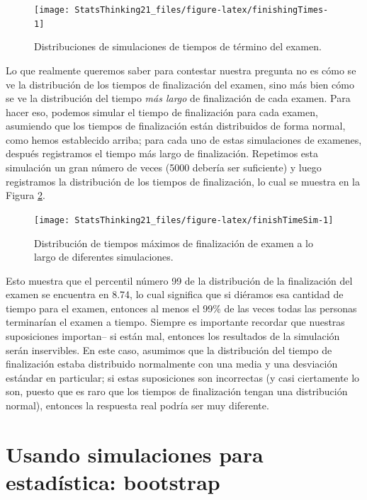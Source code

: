 \documentclass[
  12pt,
]{book}
\begin{document}
\begin{figure}
\texttt{[image: StatsThinking21\_files/figure-latex/finishingTimes-1]} \caption{Distribuciones de simulaciones de tiempos de término del examen.}\label{fig:finishingTimes}
\end{figure}

Lo que realmente queremos saber para contestar nuestra pregunta no es cómo se ve la distribución de los tiempos de finalización del examen, sino más bien cómo se ve la distribución del tiempo \emph{más largo} de finalización de cada examen. Para hacer eso, podemos simular el tiempo de finalización para cada examen, asumiendo que los tiempos de finalización están distribuidos de forma normal, como hemos establecido arriba; para cada uno de estas simulaciones de examenes, después registramos el tiempo más largo de finalización. Repetimos esta simulación un gran número de veces (5000 debería ser suficiente) y luego registramos la distribución de los tiempos de finalización, lo cual se muestra en la Figura \ref{fig:finishTimeSim}.

\begin{figure}
\texttt{[image: StatsThinking21\_files/figure-latex/finishTimeSim-1]} \caption{Distribución de tiempos máximos de finalización de examen a lo largo de diferentes simulaciones.}\label{fig:finishTimeSim}
\end{figure}

Esto muestra que el percentil número 99 de la distribución de la finalización del examen se encuentra en 8.74, lo cual significa que si diéramos esa cantidad de tiempo para el examen, entonces al menos el 99\% de las veces todas las personas terminarían el examen a tiempo. Siempre es importante recordar que nuestras suposiciones importan-- si están mal, entonces los resultados de la simulación serán inservibles. En este caso, asumimos que la distribución del tiempo de finalización estaba distribuido normalmente con una media y una desviación estándar en particular; si estas suposiciones son incorrectas (y casi ciertamente lo son, puesto que es raro que los tiempos de finalización tengan una distribución normal), entonces la respuesta real podría ser muy diferente.

\hypertarget{usando-simulaciones-para-estaduxedstica-bootstrap}{%
\section{Usando simulaciones para estadística: bootstrap}\label{usando-simulaciones-para-estaduxedstica-bootstrap}}
\end{document}
